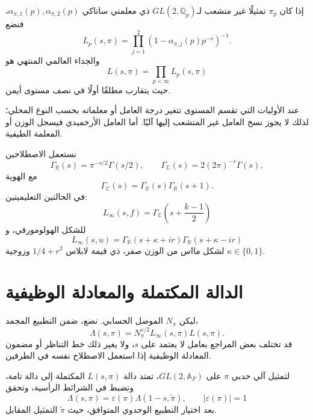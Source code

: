 \begin{definition}
\label{def:ch21-unramified-local-factor}
إذا كان \(\pi_p\) تمثيلًا غير متشعب لـ\(GL(2,\mathbb Q_p)\) ذي
معلمتي ساتاكي \(\alpha_{\pi,1}(p),\alpha_{\pi,2}(p)\)، فنضع
\[
L_p(s,\pi)
=
\prod_{j=1}^{2}
\left(1-\alpha_{\pi,j}(p)p^{-s}\right)^{-1}.
\]
والجداء العالمي المنتهي هو
\[
L(s,\pi)=\prod_{p<\infty}L_p(s,\pi)
\]
حيث يتقارب مطلقًا أولًا في نصف مستوى أيمن.
\end{definition}

عند الأوليات التي تقسم المستوى تتغير درجة العامل أو معلماته بحسب النوع
المحلي؛ لذلك لا يجوز نسخ العامل غير المتشعب إليها آليًا. أما العامل
الأرخميدي فيسجل الوزن أو المعلمة الطيفية.

نستعمل الاصطلاحين
\[
\Gamma_{\mathbb R}(s)=\pi^{-s/2}\Gamma(s/2),
\qquad
\Gamma_{\mathbb C}(s)=2(2\pi)^{-s}\Gamma(s),
\]
مع الهوية
\[
\Gamma_{\mathbb C}(s)
=
\Gamma_{\mathbb R}(s)\Gamma_{\mathbb R}(s+1).
\]
في الحالتين التعليميتين:
\[
L_\infty(s,f)
=
\Gamma_{\mathbb C}\!\left(s+\frac{k-1}{2}\right)
\]
للشكل الهولومورفي، و
\[
L_\infty(s,u)
=
\Gamma_{\mathbb R}(s+\kappa+ir)
\Gamma_{\mathbb R}(s+\kappa-ir)
\]
لشكل مااس من الوزن صفر، ذي قيمة لابلاس \(1/4+r^2\) وزوجية
\(\kappa\in\{0,1\}\).

\section{الدالة المكتملة والمعادلة الوظيفية}

ليكن \(N_\pi\) الموصل الحسابي. نضع، ضمن التطبيع المجمد،
\[
\Lambda(s,\pi)
=
N_\pi^{s/2}L_\infty(s,\pi)L(s,\pi).
\]
قد تختلف بعض المراجع بعامل لا يعتمد على \(s\)، ولا يغير ذلك خط التناظر
أو مضمون المعادلة الوظيفية إذا استعمل الاصطلاح نفسه في الطرفين.

\begin{theorem}
\label{thm:ch21-functional-equation}
لتمثيل آلي حدبي \(\pi\) على \(GL(2,\mathbb A_F)\)، تمتد دالة
\(L(s,\pi)\) المكتملة إلى دالة تامة، وتضبط في الشرائط الرأسية، وتحقق
\[
\Lambda(s,\pi)
=
\varepsilon(\pi)
\Lambda(1-s,\widetilde\pi),
\qquad
|\varepsilon(\pi)|=1
\]
بعد اختيار التطبيع الوحدوي المتوافق، حيث \(\widetilde\pi\) التمثيل
المقابل.
\end{theorem}

